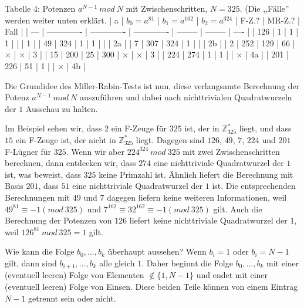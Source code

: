 \documentclass[a4paper]{article}
\begin{document}
\begin{multicols}{3}
        Tabelle 4: Potenzen $a^{N-1}\ mod\ N$ mit Zwischenschritten, $N=325$. (Die ,,Fälle'' werden weiter unten erklärt.
        | a   | $b_0 =a^{81}$ | $b_1=a^{162}$ | $b_2=a^{324}$ | F-Z.?    | MR-Z.?   | Fall |
        | --- | ------------- | ------------- | ------------- | -------- | -------- | ---- |
        | 126 | 1             | 1             | 1             |          |          | 1    |
        | 49  | 324           | 1             | 1             |          |          | 2a   |
        | 7   | 307           | 324           | 1             |          |          | 2b   |
        | 2   | 252           | 129           | 66            | $\times$ | $\times$ | 3    |
        | 15  | 200           | 25            | 300           | $\times$ | $\times$ | 3    |
        | 224 | 274           | 1             | 1             |          | $\times$ | 4a   |
        | 201 | 226           | 51            | 1             |          | $\times$ | 4b   |

        Die Grundidee des Miller-Rabin-Tests ist nun, diese verlangsamte Berechnung der Potenz $a^{N-1}\ mod\ N$ auszuführen und dabei nach nichttrivialen Quadratwurzeln der $1$ Ausschau zu halten.

        Im Beispiel sehen wir, dass $2$ ein F-Zeuge für $325$ ist, der in $\mathbb{Z}^*_{325}$ liegt, und dass $15$ ein F-Zeuge ist, der nicht in $\mathbb{Z}^*_{325}$ liegt. Dagegen sind $126$, $49$, $7$, $224$ und $201$ F-Lügner für $325$. Wenn wir aber $224^{324}\ mod\ 325$ mit zwei Zwischenschritten berechnen, dann entdecken wir, dass $274$ eine nichttriviale Quadratwurzel der $1$ ist, was beweist, dass $325$ keine Primzahl ist. Ähnlich liefert die Berechnung mit Basis $201$, dass $51$ eine nichttriviale Quadratwurzel der $1$ ist. Die entsprechenden Berechnungen mit $49$ und $7$ dagegen liefern keine weiteren Informationen, weil $49^{81} \equiv -1 (mod\ 325)$ und $7^{162} \equiv 32^{162} \equiv -1 (mod\ 325)$ gilt. Auch die Berechnung der Potenzen von $126$ liefert keine nichttriviale Quadratwurzel der $1$, weil $126^{81}\ mod\ 325 = 1$ gilt.

        Wie kann die Folge $b_0,...,b_k$ überhaupt aussehen? Wenn $b_i=1$ oder $b_i=N-1$ gilt, dann sind $b_{i+1},...,b_k$ alle gleich $1$. Daher beginnt die Folge $b_0,...,b_k$ mit einer (eventuell leeren) Folge von Elementen $\not\in\{1,N-1\}$ und endet mit einer (eventuell leeren) Folge von Einsen. Diese beiden Teile können von einem Eintrag $N-1$ getrennt sein oder nicht.


\end{multicols}
\end{document}
